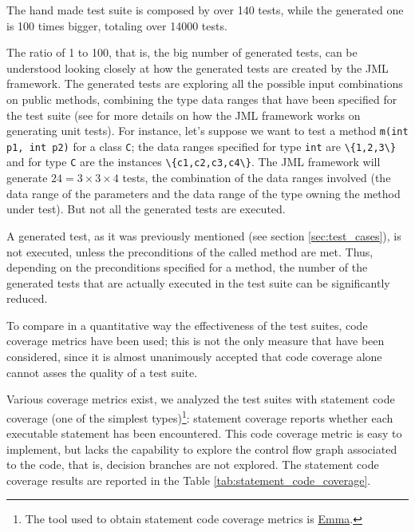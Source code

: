 \documentclass{article} \usepackage{times}
\newcommand{\myhref}[2]{\ifpdf\href{#1}{#2}\else\htmladdnormallinkfoot{#2}{#1}\fi}
\newcommand{\lil}[1]{\texttt{\lstinline|#1|}}
\begin{document}
The hand made test suite is composed by over 140 tests, while the
generated one is 100 times bigger, totaling over 14000 tests.

The ratio of 1 to 100, that is, the big number of generated tests, can
be understood looking closely at how the generated tests are created
by the JML framework. The generated tests are exploring all the
possible input combinations on public methods, combining the type data
ranges that have been specified for the test suite (see
\cite{Cheon-Leavens02} for more details on how the JML framework works
on generating unit tests). For instance, let's suppose we want to test
a method \lil{m(int p1, int p2)} for a class \lil{C}; the data ranges
specified for type \lil{int} are \lil{\{1,2,3\}} and for type \lil{C}
are the instances \lil{\{c1,c2,c3,c4\}}. The JML framework will
generate $24 = 3 \times 3 \times 4$ tests, the combination of the data
ranges involved (the data range of the parameters and the data range
of the type owning the method under test). But not all the generated
tests are executed.

A generated test, as it was previously mentioned (see section
\ref{sec:test_cases}), is not executed, unless the preconditions of
the called method are met. Thus, depending on the preconditions
specified for a method, the number of the generated tests that are
actually executed in the test suite can be significantly reduced.

To compare in a quantitative way the effectiveness of the test suites,
code coverage metrics have been used; this is not the only measure
that have been considered, since it is almost unanimously accepted
that code coverage alone cannot asses the quality of a test
suite\cite{Marick1999,Chockler2006}.

Various coverage metrics exist, we analyzed the test suites with
statement code coverage (one of the simplest types)\footnote{The tool
  used to obtain statement code coverage metrics is
  \myhref{http://emma.sourceforge.net/}{Emma}.}: statement coverage
reports whether each executable statement has been encountered. This
code coverage metric is easy to implement, but lacks the capability to
explore the control flow graph associated to the code, that is,
decision branches are not explored. The statement code coverage
results are reported in the Table \ref{tab:statement_code_coverage}.
\end{document}
